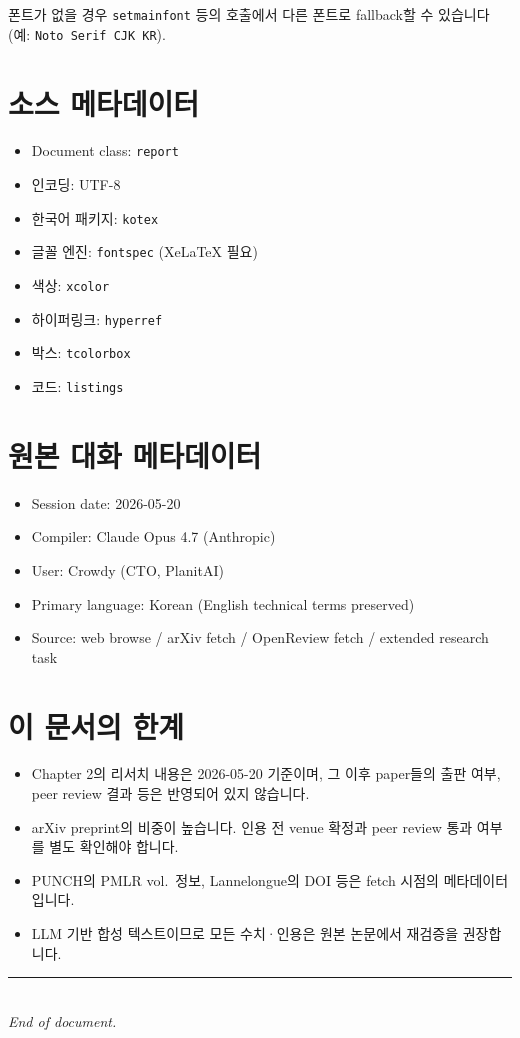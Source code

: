 \documentclass[11pt,a4paper,oneside]{report}
\newcommand{\code}[1]{\texttt{#1}}
\begin{document}
폰트가 없을 경우 \code{setmainfont} 등의 호출에서 다른 폰트로 fallback할 수 있습니다 (예: \code{Noto Serif CJK KR}).

\section{소스 메타데이터}

\begin{itemize}
\item Document class: \code{report}
\item 인코딩: UTF-8
\item 한국어 패키지: \code{kotex}
\item 글꼴 엔진: \code{fontspec} (XeLaTeX 필요)
\item 색상: \code{xcolor}
\item 하이퍼링크: \code{hyperref}
\item 박스: \code{tcolorbox}
\item 코드: \code{listings}
\end{itemize}

\section{원본 대화 메타데이터}

\begin{itemize}
\item Session date: 2026-05-20
\item Compiler: Claude Opus 4.7 (Anthropic)
\item User: Crowdy (CTO, PlanitAI)
\item Primary language: Korean (English technical terms preserved)
\item Source: web browse / arXiv fetch / OpenReview fetch / extended research task
\end{itemize}

\section{이 문서의 한계}

\begin{warningbox}[중요]
\begin{itemize}
\item Chapter 2의 리서치 내용은 2026-05-20 기준이며, 그 이후 paper들의 출판 여부, peer review 결과 등은 반영되어 있지 않습니다.
\item arXiv preprint의 비중이 높습니다. 인용 전 venue 확정과 peer review 통과 여부를 별도 확인해야 합니다.
\item PUNCH의 PMLR vol.\ 정보, Lannelongue의 DOI 등은 fetch 시점의 메타데이터입니다.
\item LLM 기반 합성 텍스트이므로 모든 수치·인용은 원본 논문에서 재검증을 권장합니다.
\end{itemize}
\end{warningbox}

\vspace{1cm}
\begin{center}
\rule{8cm}{0.4pt}\\[4pt]
\textit{End of document.}
\end{center}
\end{document}
